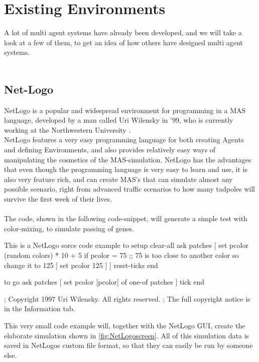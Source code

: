 \chapter{Existing Environments}
\label{sec:environments}

A lot of multi agent systems have already been developed, and we will take a look at a few of them, to get an idea of how others have designed multi agent systems.\\
\\
\section{Net-Logo}
NetLogo is a popular and widespread environment for programming in a MAS language, developed by a man called Uri Wilensky in '99, who is currently working at the Northwestern University \cite{misc:northwestern}.\\ \indent NetLogo features a very easy programming language for both creating Agents and defining Environments, and also provides relatively easy ways of manipulating the cosmetics of the MAS-simulation. NetLogo has the advantages that even though the programming language is very easy to learn and use, it is also very feature rich, and can create MAS's that can simulate almost any possible scenario, right from advanced traffic scenarios to how many tadpoles will survive the first week of their lives. \\
\\
The code, shown in the following code-snippet, will generate a simple test with color-mixing, to simulate passing of genes.

\begin{NetLogo}{This is a NetLogo sorce code example}{}
to setup
  clear-all
  ask patches
    [ set pcolor (random colors) * 10 + 5
        if pcolor = 75  ;; 75 is too close to another color so change it to 125
          [ set pcolor 125 ] ]
  reset-ticks
end

to go
  ask patches [ set pcolor [pcolor] of one-of patches ]
  tick
end


; Copyright 1997 Uri Wilensky. All rights reserved.
; The full copyright notice is in the Information tab.
\end{NetLogo}

This very small code example will, together with the NetLogo GUI, create the elaborate simulation shown in \ref{fig:NetLogoscreen}. All of this simulation data is saved in NetLogos custom file format, so that they can easily be run by someone else.

